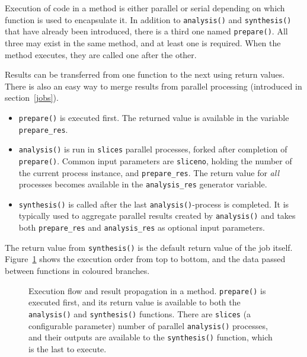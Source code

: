 Execution of code in a method is either parallel or serial depending
on which function is used to encapsulate it.  In addition to
\texttt{analysis()} and \texttt{synthesis()} that have already been
introduced, there is a third one named \texttt{prepare()}.  All three
may exist in the same method, and at least one is required.  When the
method executes, they are called one after the other.

Results can be transferred from one function to the next using return
values.  There is also an easy way to merge results from parallel
processing (introduced in section~\ref{jobs}).

\begin{itemize}
\item[] \texttt{prepare()} is executed first.  The returned value is
  available in the variable \texttt{prepare\_res}.
\item[] \texttt{analysis()} is run in \texttt{slices} parallel
  processes, forked after completion of \texttt{prepare()}.  Common
  input parameters are \texttt{sliceno}, holding the number of the
  current process instance, and \texttt{prepare\_res}.  The return
  value for \emph{all} processes becomes available in the
  \texttt{analysis\_res} generator variable.
\item[] \texttt{synthesis()} is called after the last
  \texttt{analysis()}-process is completed.  It is typically used to
  aggregate parallel results created by \texttt{analysis()} and takes
  both \texttt{prepare\_res} and \texttt{analysis\_res} as optional
  input parameters.
\end{itemize}
The return value from \texttt{synthesis()} is the default return value
of the job itself.  Figure~\ref{fig:prepanasyn} shows the execution
order from top to bottom, and the data passed between functions in
coloured branches.

\begin{figure}[b]
  \begin{center}
    
    \caption{Execution flow and result propagation in a method.
      \texttt{prepare()} is executed first, and its return value is
      available to both the \texttt{analysis()} and
      \texttt{synthesis()} functions.  There are \texttt{slices} (a
      configurable parameter) number of parallel \texttt{analysis()}
      processes, and their outputs are available to the
      \texttt{synthesis()} function, which is the last to execute.}
    \label{fig:prepanasyn}
  \end{center}
\end{figure}





